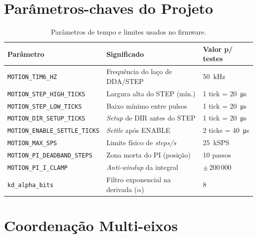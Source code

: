 \FloatBarrier
\section{Par\^ametros-chaves do Projeto}
\label{sec:parametros}

\begin{table}[H]
  \centering
  \caption{Par\^ametros de tempo e limites usados no firmware.}
  \label{tab:param}
  \setlength{\tabcolsep}{4pt}\footnotesize
  \begin{tabularx}{\textwidth}{lXl}
    \toprule
    Par\^ametro & Significado & Valor p/ testes \\
    \midrule
    \texttt{MOTION\_TIM6\_HZ} & Frequ\^encia do la\c{c}o de DDA/STEP & \SI{50}{kHz} \\
    \texttt{MOTION\_STEP\_HIGH\_TICKS} & Largura alta do STEP (m\'in.) & 1 tick = \SI{20}{\micro s} \\
    \texttt{MOTION\_STEP\_LOW\_TICKS} & Baixo m\'inimo entre pulsos & 1 tick = \SI{20}{\micro s} \\
    \texttt{MOTION\_DIR\_SETUP\_TICKS} & \emph{Setup} de DIR antes do STEP & 1 tick = \SI{20}{\micro s} \\
    \texttt{MOTION\_ENABLE\_SETTLE\_TICKS} & \emph{Settle} ap\'os ENABLE & 2 ticks = \SI{40}{\micro s} \\
    \texttt{MOTION\_MAX\_SPS} & Limite f\'isico de \emph{steps/s} & \SI{25}{kSPS} \\
    \texttt{MOTION\_PI\_DEADBAND\_STEPS} & Zona morta do PI (posi\c{c}\~ao) & 10 passos \\
    \texttt{MOTION\_PI\_I\_CLAMP} & \emph{Anti-windup} da integral & $\pm\,200\,000$ \\
    \texttt{kd\_alpha\_bits} & Filtro exponencial na derivada ($\alpha$) & 8 \\
  \bottomrule
  \end{tabularx}
\end{table}

\FloatBarrier
\section{Coordena\c{c}\~ao Multi-eixos}
\label{sec:casc-progress}


